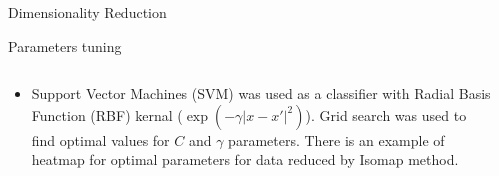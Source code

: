 \documentclass[final,hyperref={pdfpagelabels=false}]{beamer}
\begin{document}
\begin{frame}[t]
\begin{columns}[t]
\begin{column}{.465\textwidth}
\begin{block}{Dimensionality Reduction}
\end{block}


\begin{block}{Parameters tuning}
\begin{columns} %
\begin{column}{.4\textwidth} %
\begin{itemize}
\item Support Vector Machines (SVM) was used as a classifier with Radial Basis Function (RBF) kernal ($\exp(-\gamma |x-x'|^2)$). Grid search was used to 
find optimal values for $C$ and $\gamma$ parameters. There is an example of heatmap for optimal parameters for data reduced by Isomap method. 



\end{itemize}
\end{column}

\begin{column}{.4\textwidth}



\end{column}
\end{columns}
\end{block}
\end{column}
\end{columns}
\end{frame}
\end{document}
